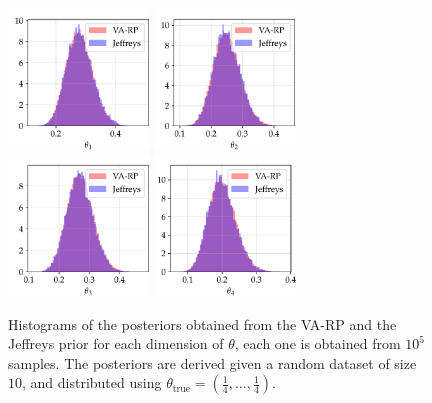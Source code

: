 \begin{figure}[h]
    \centering
    \includegraphics[width=3.75cm]{figures/va-rp/multi-post_1.pdf}\hspace*{0.25cm}
    \includegraphics[width=3.75cm]{figures/va-rp/multi-post_2.pdf}\hspace*{0.25cm}
    \includegraphics[width=3.75cm]{figures/va-rp/multi-post_3.pdf}\hspace*{0.25cm}
    \includegraphics[width=3.75cm]{figures/va-rp/multi-post_4.pdf}%
    \caption{Histograms of the posteriors obtained from the VA-RP and the Jeffreys prior for each dimension of $\theta$, each one is obtained from $10^5$ samples. 
    The posteriors are derived
    given a random dataset of size $10$, and distributed using $\theta_{\text{true}}=(\frac{1}{4},\dots,\frac{1}{4})$.}
    \label{fig:multi_post}
\end{figure}



